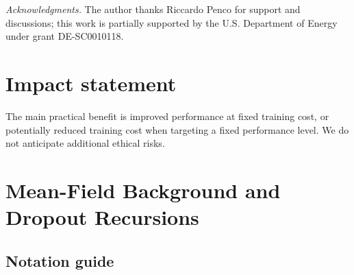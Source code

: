 \documentclass{article}
\theoremstyle{plain}
\theoremstyle{definition}
\theoremstyle{remark}
\begin{document}
\noindent\emph{Acknowledgments.} The author thanks Riccardo Penco for support and discussions; this work is partially supported by the U.S. Department of Energy under grant DE-SC0010118.








\section*{Impact statement}
The main practical benefit is improved performance at fixed training cost, or potentially reduced training cost when targeting a fixed performance level. We do not anticipate additional ethical risks.






\newpage
\onecolumn


\appendix










\section{Mean-Field Background and Dropout Recursions}










\subsection{Notation guide}
\label{app:notation}
\end{document}
